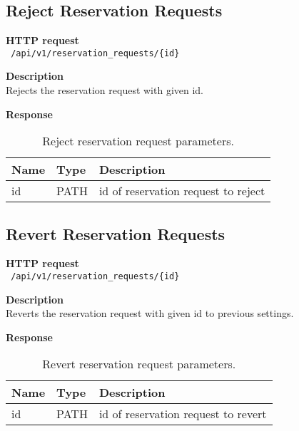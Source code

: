 \subsection{Reject Reservation Requests}
\begin{description}
    \item \textbf{HTTP request}\\
        \texttt{\text{[POST]} /api/v1/reservation\_requests/\{id\}}
    \item \textbf{Description}\\
        Rejects the reservation request with given id.
    \item \textbf{Response}\\
        \texttt{\text{[200 OK]}}
\end{description}
\begin{table}[ht!]
    \begin{tabularx}{\textwidth}{llX}
        \toprule
        Name & Type & Description \\
        \midrule
        id & PATH & id of reservation request to reject \\
        \bottomrule
        \end{tabularx}
    \caption{Reject reservation request parameters.}
\end{table}

\subsection{Revert Reservation Requests}
\begin{description}
    \item \textbf{HTTP request}\\
        \texttt{\text{[POST]} /api/v1/reservation\_requests/\{id\}}
    \item \textbf{Description}\\
        Reverts the reservation request with given id to previous settings.
    \item \textbf{Response}\\
        \texttt{\text{[200 OK]}}
\end{description}
\begin{table}[ht!]
    \begin{tabularx}{\textwidth}{llX}
        \toprule
        Name & Type & Description \\
        \midrule
        id & PATH & id of reservation request to revert \\
        \bottomrule
        \end{tabularx}
    \caption{Revert reservation request parameters.}
\end{table}
